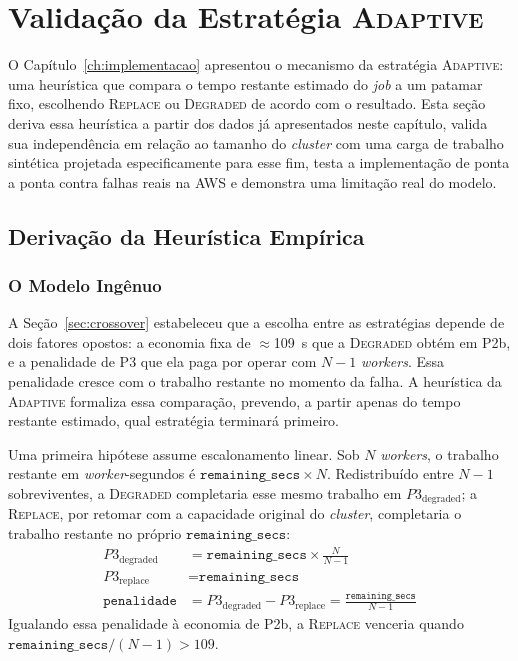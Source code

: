 \section{Validação da Estratégia \textsc{Adaptive}}
\label{sec:adaptive}

O Capítulo~\ref{ch:implementacao} apresentou o mecanismo da estratégia \textsc{Adaptive}:
uma heurística que compara o tempo restante estimado do \textit{job} a um patamar fixo,
escolhendo \textsc{Replace} ou \textsc{Degraded} de acordo com o resultado. Esta seção
deriva essa heurística a partir dos dados já apresentados neste capítulo, valida sua
independência em relação ao tamanho do \textit{cluster} com uma carga de trabalho
sintética projetada especificamente para esse fim, testa a implementação de ponta a
ponta contra falhas reais na AWS e demonstra uma limitação real do modelo.

\subsection{Derivação da Heurística Empírica}
\label{sec:adaptive-derivacao}

\subsubsection{O Modelo Ingênuo}

A Seção~\ref{sec:crossover} estabeleceu que a escolha entre as estratégias depende de
dois fatores opostos: a economia fixa de $\approx$109~s que a \textsc{Degraded} obtém
em P2b, e a penalidade de P3 que ela paga por operar com $N-1$ \textit{workers}. Essa
penalidade cresce com o trabalho restante no momento da falha. A heurística da
\textsc{Adaptive} formaliza essa comparação, prevendo, a partir apenas do tempo
restante estimado, qual estratégia terminará primeiro.

Uma primeira hipótese assume escalonamento linear. Sob $N$ \textit{workers}, o
trabalho restante em \textit{worker}-segundos é $\texttt{remaining\_secs} \times N$.
Redistribuído entre $N-1$ sobreviventes, a \textsc{Degraded} completaria esse mesmo
trabalho em $P3_{\text{degraded}}$; a \textsc{Replace}, por retomar com a capacidade
original do \textit{cluster}, completaria o trabalho restante no próprio
$\texttt{remaining\_secs}$:
\begin{align*}
P3_{\text{degraded}} &= \texttt{remaining\_secs} \times \frac{N}{N-1} \\
P3_{\text{replace}} &= \texttt{remaining\_secs} \\
\texttt{penalidade} &= P3_{\text{degraded}} - P3_{\text{replace}} = \frac{\texttt{remaining\_secs}}{N-1}
\end{align*}
Igualando essa penalidade à economia de P2b, a \textsc{Replace} venceria quando
$\texttt{remaining\_secs}/(N-1) > 109$.

